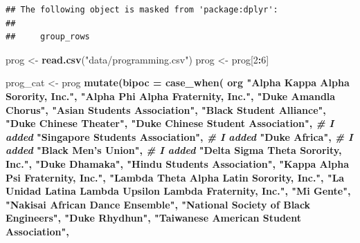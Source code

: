 \documentclass[]{article}
\newenvironment{Shaded}{\begin{snugshade}}{\end{snugshade}}
\newcommand{\CommentTok}[1]{\textcolor[rgb]{0.56,0.35,0.01}{\textit{#1}}}
\newcommand{\DataTypeTok}[1]{\textcolor[rgb]{0.13,0.29,0.53}{#1}}
\newcommand{\DecValTok}[1]{\textcolor[rgb]{0.00,0.00,0.81}{#1}}
\newcommand{\KeywordTok}[1]{\textcolor[rgb]{0.13,0.29,0.53}{\textbf{#1}}}
\newcommand{\NormalTok}[1]{#1}
\newcommand{\OperatorTok}[1]{\textcolor[rgb]{0.81,0.36,0.00}{\textbf{#1}}}
\newcommand{\StringTok}[1]{\textcolor[rgb]{0.31,0.60,0.02}{#1}}
\begin{document}
\begin{verbatim}
## The following object is masked from 'package:dplyr':
## 
##     group_rows
\end{verbatim}

\begin{Shaded}
\begin{Highlighting}[]
\NormalTok{prog <-}\StringTok{ }\KeywordTok{read.csv}\NormalTok{(}\StringTok{"data/programming.csv"}\NormalTok{)}
\NormalTok{prog <-}\StringTok{ }\NormalTok{prog[}\DecValTok{2}\OperatorTok{:}\DecValTok{6}\NormalTok{] }
\end{Highlighting}
\end{Shaded}

\begin{Shaded}
\begin{Highlighting}[]
\NormalTok{prog_cat <-}\StringTok{ }\NormalTok{prog }\OperatorTok{%
\StringTok{  }\KeywordTok{mutate}\NormalTok{(}\DataTypeTok{bipoc =} \KeywordTok{case_when}\NormalTok{(}
\NormalTok{    org }\OperatorTok{%
              \StringTok{"Alpha Kappa Alpha Sorority, Inc."}\NormalTok{,}
              \StringTok{"Alpha Phi Alpha Fraternity, Inc."}\NormalTok{,}
              \StringTok{"Duke Amandla Chorus"}\NormalTok{,}
              \StringTok{"Asian Students Association"}\NormalTok{,}
              \StringTok{"Black Student Alliance"}\NormalTok{,}
              \StringTok{"Duke Chinese Theater"}\NormalTok{,}
              \StringTok{"Duke Chinese Student Association"}\NormalTok{, }\CommentTok{# I added}
              \StringTok{"Singapore Students Association"}\NormalTok{, }\CommentTok{# I added}
              \StringTok{"Duke Africa"}\NormalTok{, }\CommentTok{# I added}
              \StringTok{"Black Men's Union"}\NormalTok{, }\CommentTok{# I added}
              \StringTok{"Delta Sigma Theta Sorority, Inc."}\NormalTok{,}
              \StringTok{"Duke Dhamaka"}\NormalTok{,}
              \StringTok{"Hindu Students Association"}\NormalTok{,}
              \StringTok{"Kappa Alpha Psi Fraternity, Inc."}\NormalTok{,}
              \StringTok{"Lambda Theta Alpha Latin Sorority, Inc."}\NormalTok{,}
              \StringTok{"La Unidad Latina Lambda Upsilon Lambda Fraternity, Inc."}\NormalTok{,}
              \StringTok{"Mi Gente"}\NormalTok{,}
              \StringTok{"Nakisai African Dance Ensemble"}\NormalTok{,}
              \StringTok{"National Society of Black Engineers"}\NormalTok{,}
              \StringTok{"Duke Rhydhun"}\NormalTok{,}
              \StringTok{"Taiwanese American Student Association"}\NormalTok{,}
}}
\end{Highlighting}
\end{Shaded}
\end{document}
